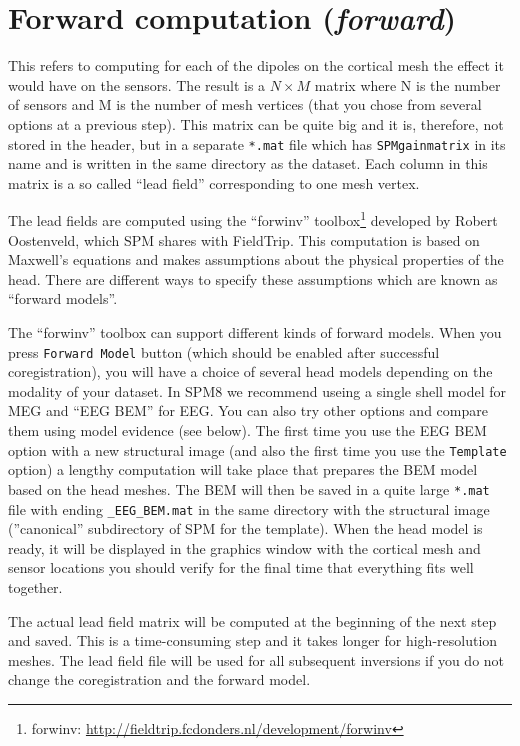\section{Forward computation (\textit{forward})}
This refers to computing for each of the dipoles on the cortical mesh the effect it would have on the sensors. The result is a $N \times M$ matrix where N is the number of sensors and M is the number of mesh vertices (that you chose from several options at a previous step). This matrix can be quite big and it is, therefore, not stored in the header, but in a separate \texttt{*.mat} file which has \texttt{SPMgainmatrix} in its name and is written in the same directory as the dataset. Each column in this matrix is a so called ``lead field'' corresponding to one mesh vertex.

The lead fields are computed using the ``forwinv'' toolbox\footnote{forwinv: \url{http://fieldtrip.fcdonders.nl/development/forwinv}} developed by Robert Oostenveld, which SPM shares with FieldTrip. This computation is based on Maxwell's equations and makes assumptions about the physical properties of the head. There are different ways to specify these assumptions which are known as ``forward models''.

The ``forwinv'' toolbox can support different kinds of forward models. When you press \texttt{Forward Model} button (which should be enabled after successful coregistration), you will have a choice of several head models depending on the modality of your dataset. In SPM8 we recommend useing a single shell model for MEG and ``EEG BEM'' for EEG. You can also try other options and compare them using model evidence (see below). The first time you use the EEG BEM option with a new structural image (and also the first time you use the \texttt{Template} option) a lengthy computation will take place that prepares the BEM model based on the head meshes. The BEM will then be saved in a quite large \texttt{*.mat} file with ending \texttt{\_EEG\_BEM.mat} in the same directory with the structural image (''canonical'' subdirectory of SPM for the template). When the head model is ready, it will be displayed in the graphics window with the cortical mesh and sensor locations you should verify for the final time that everything fits well together.

The actual lead field matrix will be computed at the beginning of the next step and saved. This is a time-consuming step and it takes longer for high-resolution meshes. The lead field file will be used for all subsequent inversions if you do not change the coregistration and the forward model.


